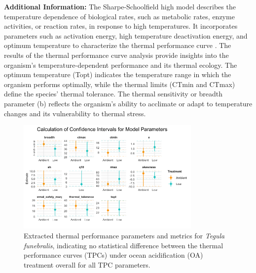 \documentclass[
  12pt,
]{article}
\begin{document}
\textbf{Additional Information:} The Sharpe-Schoolfield high model
describes the temperature dependence of biological rates, such as
metabolic rates, enzyme activities, or reaction rates, in response to
high temperatures. It incorporates parameters such as activation energy,
high temperature deactivation energy, and optimum temperature to
characterize the thermal performance curve \cite{sharpe1981non}. The
results of the thermal performance curve analysis provide insights into
the organism's temperature-dependent performance and its thermal
ecology. The optimum temperature (Topt) indicates the temperature range
in which the organism performs optimally, while the thermal limits
(CTmin and CTmax) define the species' thermal tolerance. The thermal
sensitivity or breadth parameter (b) reflects the organism's ability to
acclimate or adapt to temperature changes and its vulnerability to
thermal stress.

\begin{figure}[htbp]
  \centering
  \includegraphics[width=0.8\textwidth]{Images/params.jpg}
  \caption{Extracted thermal performance parameters and metrics for \textit{Tegula funebralis}, indicating no statistical difference between the thermal performance curves (TPCs) under ocean acidification (OA) treatment overall for all TPC parameters.}
  \label{fig:tpc-params}
\end{figure}
\end{document}
